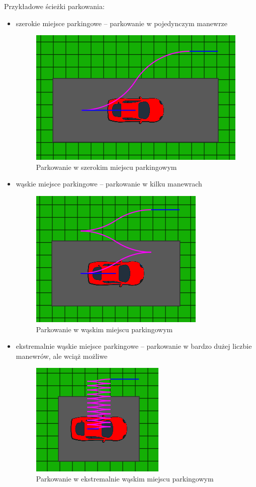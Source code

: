 \documentclass[a4paper,11pt,twoside]{report}
\theoremstyle{definition}
\begin{document}
Przykładowe ścieżki parkowania:
\begin{itemize}
	\item szerokie miejsce parkingowe – parkowanie w pojedynczym manewrze
	\begin{figure}[h!]
\centering
\includegraphics[scale=0.68]{parkingPathParallel1}
\caption[Parkowanie w szerokim miejscu parkingowym]{Parkowanie w szerokim miejscu parkingowym}
\end{figure}
	\item wąskie miejsce parkingowe – parkowanie w kilku manewrach
	\begin{figure}[h!]
\centering
\includegraphics[scale=0.70]{parkingPathParallel2}
\caption[Parkowanie w wąskim miejscu parkingowym]{Parkowanie w wąskim miejscu parkingowym}
\end{figure}
	\item ekstremalnie wąskie miejsce parkingowe – parkowanie w bardzo dużej liczbie manewrów, ale wciąż możliwe
	\begin{figure}[h!]
\centering
\includegraphics[scale=0.95]{parkingPathParallel3}
\caption[Parkowanie w ekstremalnie wąskim miejscu parkingowym]{Parkowanie w ekstremalnie wąskim miejscu parkingowym}
\end{figure}
\end{itemize}
\end{document}
